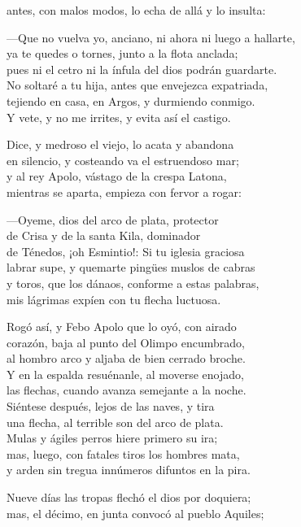 antes, con malos modos, lo echa de allá y lo insulta:\par
---Que no vuelva yo, anciano, ni ahora ni luego a hallarte,\\
ya te quedes o tornes, junto a la flota anclada;\\
pues ni el cetro ni la ínfula del dios podrán guardarte.\\
No soltaré a tu hija, antes que envejezca expatriada,\\
tejiendo en casa, en Argos, y durmiendo conmigo.\\
Y vete, y no me irrites, y evita así el castigo.\par
Dice, y medroso el viejo, lo acata y abandona\\
en silencio, y costeando va el estruendoso mar;\\
y al rey Apolo, vástago de la crespa Latona,\\
mientras se aparta, empieza con fervor a rogar:\par
---Oyeme, dios del arco de plata, protector\\
de Crisa y de la santa Kila, dominador\\
de Ténedos, ¡oh Esmintio!: Si tu iglesia graciosa\\
labrar supe, y quemarte pingües muslos de cabras\\
y toros, que los dánaos, conforme a estas palabras,\\
mis lágrimas expíen con tu flecha luctuosa.\par
Rogó así, y Febo Apolo que lo oyó, con airado\\
corazón, baja al punto del Olimpo encumbrado,\\
al hombro arco y aljaba de bien cerrado broche.\\
Y en la espalda resuénanle, al moverse enojado,\\
las flechas, cuando avanza semejante a la noche.\\
Siéntese después, lejos de las naves, y tira\\
una flecha, al terrible son del arco de plata.\\
Mulas y ágiles perros hiere primero su ira;\\
mas, luego, con fatales tiros los hombres mata,\\
y arden sin tregua innúmeros difuntos en la pira.\par
Nueve días las tropas flechó el dios por doquiera;\\
mas, el décimo, en junta convocó al pueblo Aquiles;\\
